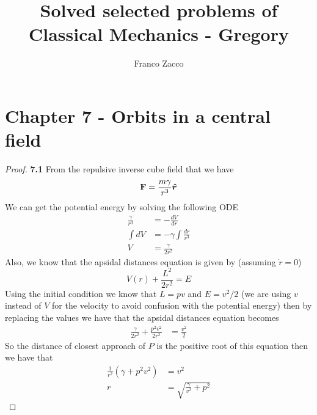 \documentclass[11pt]{article}
\title{\textbf{Solved selected problems of Classical Mechanics - Gregory}}
\author{Franco Zacco}
\date{}
\newcommand{\hatr}{\bm{\hat{r}}}
\theoremstyle{definition}
\begin{document}
\maketitle
\thispagestyle{empty}

\section*{Chapter 7 - Orbits in a central field}

	\begin{proof}{\textbf{7.1}}
        From the repulsive inverse cube field that we have
        $$\vectorbold{F} = \frac{m\gamma}{r^3} \hatr$$
        We can get the potential energy by solving the following ODE
        \begin{align*}
            \frac{\gamma}{r^3} &= -\frac{dV}{dr}\\
            \int dV &= -\gamma \int \frac{dr}{r^3}\\
            V &= \frac{\gamma}{2r^2}
        \end{align*}
        Also, we know that the apsidal distances equation is given by (assuming
        $\dot{r} = 0$)
        $$V(r) + \frac{L^2}{2r^2} = E$$
        Using the initial condition we know that $L = pv$ and $E = v^2/2$ (we are using
        $v$ instead of $V$ for the velocity to avoid confusion with the potential energy)
        then by replacing the values we have that the apsidal distances equation becomes
        \begin{align*}
            \frac{\gamma}{2r^2} + \frac{p^2v^2}{2r^2} &= \frac{v^2}{2}
        \end{align*} 
        So the distance of closest approach of $P$ is the positive root of  this
        equation then we have that 
        \begin{align*}
            \frac{1}{r^2}(\gamma + p^2v^2) &= v^2\\
            r &= \sqrt{\frac{\gamma}{v^2} + p^2}
        \end{align*}
    \end{proof}
\end{document}
